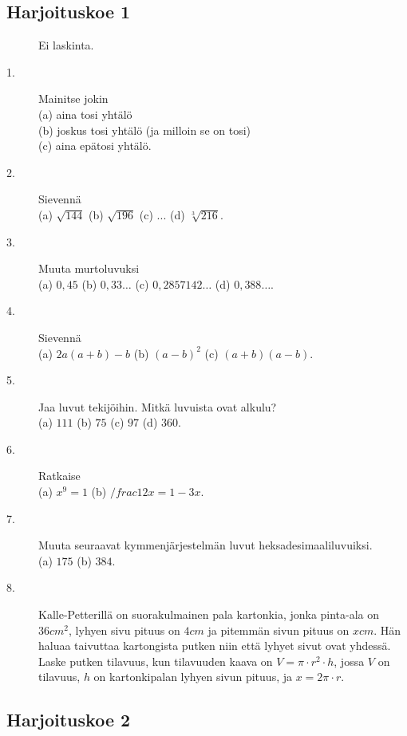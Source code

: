 \subsection*{Harjoituskoe 1}


\begin{description}
	\item[] Ei laskinta.
	\item[1.] Mainitse jokin \\
	(a) aina tosi yhtälö \\
	(b) joskus tosi yhtälö (ja milloin se on tosi) \\
	(c) aina epätosi yhtälö.
	\item[2.] Sievennä \\
	(a) $\sqrt{144}$ \qquad
	(b) $\sqrt{196}$ \qquad
	(c) $ ... $ \qquad
	(d) $\sqrt[3]{216}$.
	\item[3.] Muuta murtoluvuksi \\
	(a) $0,45$ \qquad
	(b) $0,33\ldots$ \qquad
	(c) $0,2857142\ldots$ \qquad
	(d) $0,388\ldots$.
	\item[4.] Sievennä \\
	(a) $2a(a+b)-b$ \qquad
	(b) $(a-b)^2$ \qquad
	(c) $(a+b)(a-b)$.
	\item[5.] Jaa luvut tekijöihin. Mitkä luvuista ovat alkulu? \\
	(a) $111$ \qquad
	(b) $75$ \qquad
	(c) $97$ \qquad
	(d) $360$.
	\item[6.] Ratkaise \\
	(a) $x^9 = 1$ \qquad
	(b) $/frac{1}{2}x=1-3x$.
	\item[7.] Muuta seuraavat kymmenjärjestelmän luvut heksadesimaaliluvuiksi. \\
	(a) $175$ \qquad
	(b) $384$.
	\item[8.] Kalle-Petterillä on suorakulmainen pala kartonkia, jonka pinta-ala on $36cm^2$, lyhyen sivu pituus on $4cm$ ja pitemmän sivun pituus on $x cm$. 
	Hän haluaa taivuttaa kartongista putken niin että lyhyet sivut ovat yhdessä. Laske putken tilavuus, kun tilavuuden kaava on $V=\pi\cdot r^2\cdot h$, jossa $V$ on tilavuus, $h$ on kartonkipalan lyhyen sivun pituus, ja $x=2\pi\cdot r$.    
\end{description}

\subsection*{Harjoituskoe 2}

